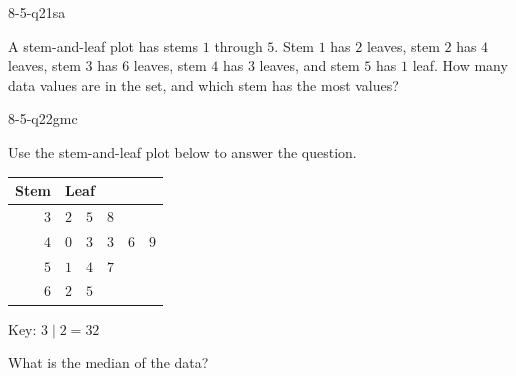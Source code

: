 \begin{practiceQuestion}{8-5-q21}{sa}
\begin{questionText}
A stem-and-leaf plot has stems $1$ through $5$. Stem $1$ has $2$ leaves, stem $2$ has $4$ leaves, stem $3$ has $6$ leaves, stem $4$ has $3$ leaves, and stem $5$ has $1$ leaf. How many data values are in the set, and which stem has the most values?
\end{questionText}
\end{practiceQuestion}


\begin{practiceQuestion}{8-5-q22}{gmc}
\begin{questionText}
Use the stem-and-leaf plot below to answer the question.

\begin{center}
\begin{tabular}{r|l}
\textbf{Stem} & \textbf{Leaf} \\
\hline
$3$ & $2 \quad 5 \quad 8$ \\
$4$ & $0 \quad 3 \quad 3 \quad 6 \quad 9$ \\
$5$ & $1 \quad 4 \quad 7$ \\
$6$ & $2 \quad 5$ \\
\end{tabular}
\end{center}

Key: $3 \mid 2 = 32$

What is the median of the data?
\end{questionText}
\end{practiceQuestion}

